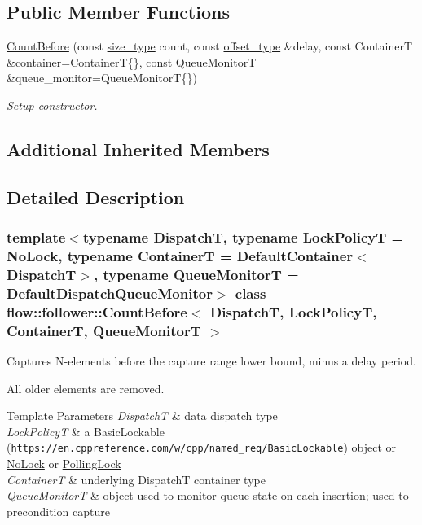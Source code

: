 \subsection*{Public Member Functions}
\begin{DoxyCompactItemize}
\item 
\hyperlink{classflow_1_1follower_1_1_count_before_a0fdc19c152e8fc8f5ad9dc3fd23af265}{Count\+Before} (const \hyperlink{classflow_1_1follower_1_1_count_before_a097b09f3a4af8a2a2772bfaddb00fdcc}{size\+\_\+type} count, const \hyperlink{classflow_1_1follower_1_1_count_before_a99a0abf1a1d75aad7a5b1958f527f0a8}{offset\+\_\+type} \&delay, const ContainerT \&container=ContainerT\{\}, const Queue\+MonitorT \&queue\+\_\+monitor=Queue\+MonitorT\{\})
\begin{DoxyCompactList}\small\item\em Setup constructor. \end{DoxyCompactList}\end{DoxyCompactItemize}
\subsection*{Additional Inherited Members}


\subsection{Detailed Description}
\subsubsection*{template$<$typename DispatchT, typename Lock\+PolicyT = No\+Lock, typename ContainerT = Default\+Container$<$\+Dispatch\+T$>$, typename Queue\+MonitorT = Default\+Dispatch\+Queue\+Monitor$>$\newline
class flow\+::follower\+::\+Count\+Before$<$ Dispatch\+T, Lock\+Policy\+T, Container\+T, Queue\+Monitor\+T $>$}

Captures N-\/elements before the capture range lower bound, minus a delay period. 

All older elements are removed.


\begin{DoxyTemplParams}{Template Parameters}
{\em DispatchT} & data dispatch type \\
\hline
{\em Lock\+PolicyT} & a Basic\+Lockable (\href{https://en.cppreference.com/w/cpp/named_req/BasicLockable}{\tt https\+://en.\+cppreference.\+com/w/cpp/named\+\_\+req/\+Basic\+Lockable}) object or \hyperlink{structflow_1_1_no_lock}{No\+Lock} or \hyperlink{structflow_1_1_polling_lock}{Polling\+Lock} \\
\hline
{\em ContainerT} & underlying {\ttfamily DispatchT} container type \\
\hline
{\em Queue\+MonitorT} & object used to monitor queue state on each insertion; used to precondition capture \\
\hline
\end{DoxyTemplParams}


